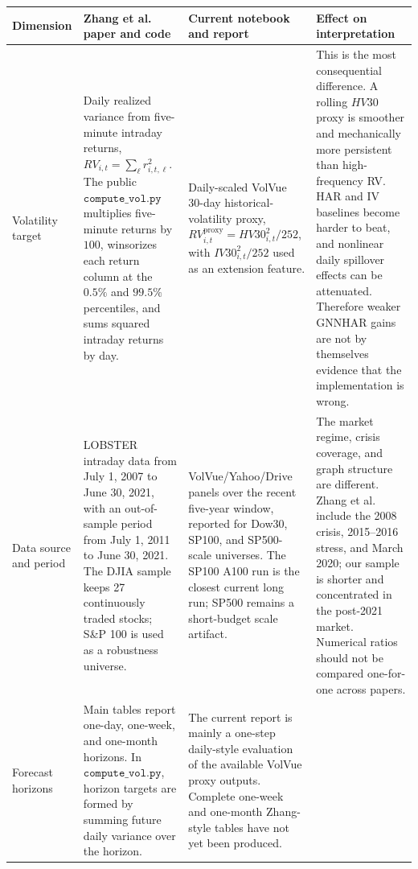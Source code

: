 \documentclass[11pt]{article}
\begin{document}
\begin{table}[H]
\centering
\scriptsize
\setlength{\tabcolsep}{4pt}
\renewcommand{\arraystretch}{1.12}
\begin{tabular}{
>{\raggedright\arraybackslash}p{}
>{\raggedright\arraybackslash}p{}
>{\raggedright\arraybackslash}p{}
>{\raggedright\arraybackslash}p{}}
\toprule
Dimension & Zhang et al. paper and code & Current notebook and report & Effect on interpretation \\
\midrule
Volatility target
& Daily realized variance from five-minute intraday returns,
\(RV_{i,t}=\sum_{\ell} r_{i,t,\ell}^{2}\).  The public \(\texttt{compute\_vol.py}\) multiplies five-minute returns by \(100\), winsorizes each return column at the \(0.5\%\) and \(99.5\%\) percentiles, and sums squared intraday returns by day.
& Daily-scaled VolVue 30-day historical-volatility proxy,
\(RV^{\mathrm{proxy}}_{i,t}=HV30_{i,t}^{2}/252\), with \(IV30_{i,t}^{2}/252\) used as an extension feature.
& This is the most consequential difference.  A rolling \(HV30\) proxy is smoother and mechanically more persistent than high-frequency RV.  HAR and IV baselines become harder to beat, and nonlinear daily spillover effects can be attenuated.  Therefore weaker GNNHAR gains are not by themselves evidence that the implementation is wrong. \\
\addlinespace
Data source and period
& LOBSTER intraday data from July 1, 2007 to June 30, 2021, with an out-of-sample period from July 1, 2011 to June 30, 2021.  The DJIA sample keeps 27 continuously traded stocks; S\&P 100 is used as a robustness universe.
& VolVue/Yahoo/Drive panels over the recent five-year window, reported for Dow30, SP100, and SP500-scale universes.  The SP100 A100 run is the closest current long run; SP500 remains a short-budget scale artifact.
& The market regime, crisis coverage, and graph structure are different.  Zhang et al. include the 2008 crisis, 2015--2016 stress, and March 2020; our sample is shorter and concentrated in the post-2021 market.  Numerical ratios should not be compared one-for-one across papers. \\
\addlinespace
Forecast horizons
& Main tables report one-day, one-week, and one-month horizons.  In \(\texttt{compute\_vol.py}\), horizon targets are formed by summing future daily variance over the horizon.
& The current report is mainly a one-step daily-style evaluation of the available VolVue proxy outputs.  Complete one-week and one-month Zhang-style tables have not yet been produced.

\end{tabular}
\end{table}
\end{document}

